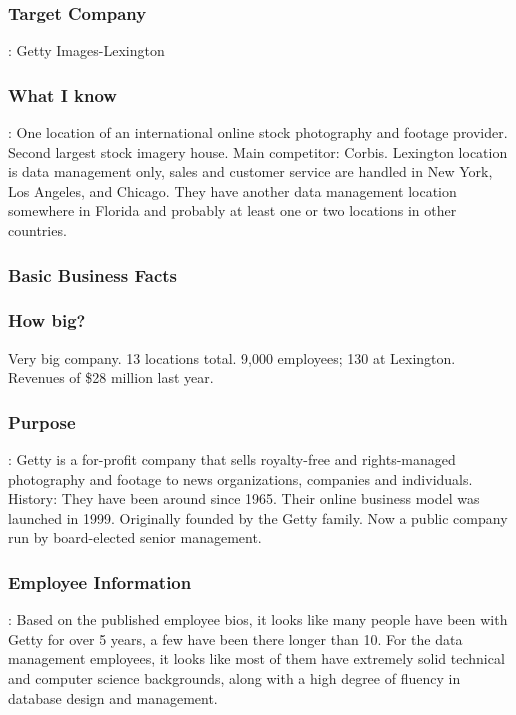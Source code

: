 \subsubsection*{Target Company}: Getty Images-Lexington

\subsubsection*{What I know}: One location of an international online stock photography and footage provider. Second largest stock imagery house. Main competitor: Corbis. Lexington location is data management only, sales and customer service are handled in New York, Los Angeles, and Chicago. They have another data management location somewhere in Florida and probably at least one or two locations in other countries.

\subsubsection*{Basic Business Facts}

\subsubsection*{How big?} Very big company. 13 locations total. 9,000 employees; 130 at Lexington. Revenues of \$28 million last year.

\subsubsection*{Purpose}: Getty is a for-profit company that sells royalty-free and rights-managed photography and footage to news organizations, companies and individuals.
History: They have been around since 1965. Their online business model was launched in 1999. Originally founded by the Getty family. Now a public company run by board-elected senior management.

\subsubsection*{Employee Information}: Based on the published employee bios, it looks like many people have been with Getty for over 5 years, a few have been there longer than 10.
For the data management employees, it looks like most of them have extremely solid technical and computer science backgrounds, along with a high degree of fluency in database design and management.

